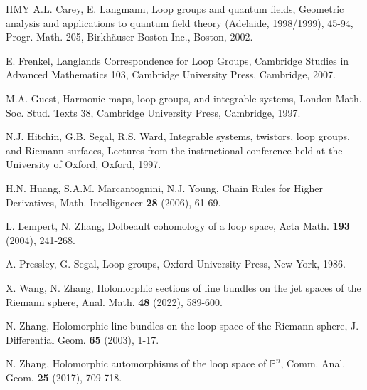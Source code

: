 \documentclass[11pt]{amsart}
\numberwithin{equation}{section}
\begin{document}
\begin{thebibliography}{HMY}
 A.L. Carey, E. Langmann,
Loop groups and quantum fields, Geometric analysis and applications to quantum field theory (Adelaide, 1998/1999), 45-94,
Progr. Math. 205,
Birkh\"{a}user Boston Inc., Boston, 2002.

E. Frenkel,
Langlands Correspondence for Loop Groups,
Cambridge Studies in Advanced Mathematics 103,
Cambridge University Press, Cambridge, 2007.

 M.A. Guest,
Harmonic maps, loop groups, and integrable systems,
London Math. Soc. Stud. Texts 38,
Cambridge University Press, Cambridge, 1997.

 N.J. Hitchin, G.B. Segal, R.S. Ward,
Integrable systems,
twistors, loop groups, and Riemann surfaces,
Lectures from the instructional conference held at the University of Oxford, Oxford, 1997.

 H.N. Huang, S.A.M. Marcantognini,
N.J. Young, Chain Rules for Higher Derivatives, Math. Intelligencer \textbf{28} (2006), 61-69.

 L. Lempert, N. Zhang, Dolbeault cohomology of a
loop space, Acta Math. \textbf{193} (2004), 241-268.

 A. Pressley, G. Segal, Loop groups, Oxford
University Press, New York, 1986.

 X. Wang, N. Zhang, Holomorphic sections of line bundles on
the jet spaces of the Riemann sphere, Anal. Math. \textbf{48} (2022), 589-600.

 N. Zhang, Holomorphic line bundles on the loop
space of the Riemann sphere, J. Differential Geom. \textbf{65} (2003), 1-17.

 N. Zhang, Holomorphic automorphisms of the loop space of
$\mathbb{P}^n$, Comm. Anal. Geom. \textbf{25} (2017), 709-718.
\end{thebibliography}
\end{document}
